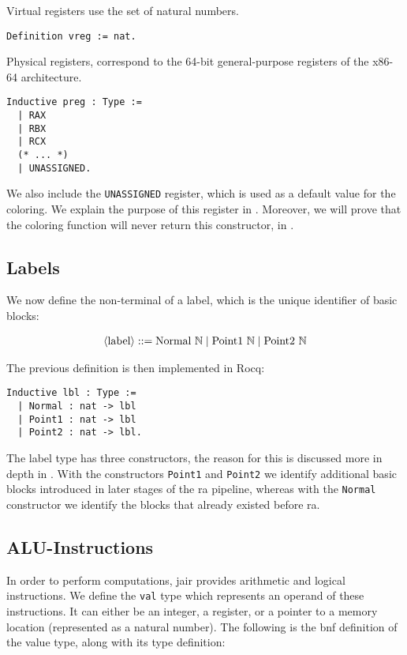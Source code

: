 Virtual registers use the set of natural numbers.

\begin{lstlisting}[style=Rocq]
Definition vreg := nat.
\end{lstlisting}

Physical registers, correspond to the 64-bit general-purpose registers of the x86-64 architecture.

\begin{lstlisting}[style=Rocq]
Inductive preg : Type :=
  | RAX
  | RBX
  | RCX
  (* ... *)
  | UNASSIGNED.
\end{lstlisting}

We also include the \texttt{UNASSIGNED} register, which is used as a default value for the coloring. We explain the purpose of this register in . Moreover, we will prove that the coloring function will never return this constructor, in .

\subsection{Labels}

We now define the non-terminal of a label, which is the unique identifier of basic blocks:

\begin{align*}
\langle\text{label}\rangle ::= \text{Normal} \ \mathbb N \mid \text{Point1} \ \mathbb N \mid \text{Point2} \ \mathbb N
\end{align*}

The previous definition is then implemented in Rocq:

\begin{lstlisting}[style=Rocq]
Inductive lbl : Type :=
  | Normal : nat -> lbl
  | Point1 : nat -> lbl
  | Point2 : nat -> lbl.
\end{lstlisting}

The label type has three constructors, the reason for this is discussed more in depth in . With the constructors \texttt{Point1} and \texttt{Point2} we identify additional basic blocks introduced in later stages of the \gls{ra} pipeline, whereas with the \texttt{Normal} constructor we identify the blocks that already existed before \gls{ra}.

\subsection{ALU-Instructions}

In order to perform computations, \gls{jair} provides arithmetic and logical instructions.
We define the \texttt{val} type which represents an operand of these instructions. It can either be an integer, a register, or a pointer to a memory location (represented as a natural number). The following is the \gls{bnf} definition of the value type, along with its type definition:

